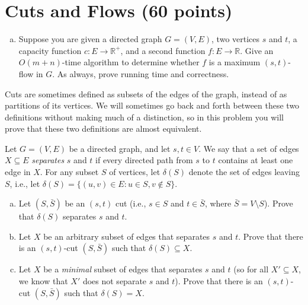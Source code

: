 \documentclass{article}
\begin{document}
\section{Cuts and Flows (60 points)}

\begin{enumerate}[(a)]
	\item Suppose you are given a directed graph $G = (V, E)$, two vertices $s$ and $t$, a capacity function $c: E \rightarrow \mathbb{R}^+$, and a second function $f : E \rightarrow \mathbb{R}$. Give an $O(m+n)$-time algorithm to determine whether $f$ is a maximum $(s,t)$-flow in $G$.  As always, prove running time and correctness.

\end{enumerate}

Cuts are sometimes defined as subsets of the edges of the graph, instead of as partitions of its vertices. We will sometimes go back and forth between these two definitions without making much of a distinction, so in this problem you will prove that these two definitions are almost equivalent.

Let $G = (V, E)$ be a directed graph, and let $s,t \in V$.  We say that a set of edges $X \subseteq E$ \emph{separates} $s$ and $t$ if every directed path from $s$ to $t$ contains at least one edge in $X$.  For any subset $S$ of vertices, let $\delta(S)$ denote the set of edges leaving $S$, i.e., let $\delta(S) = \{(u,v) \in E : u \in S, v \not\in S\}$.  

\begin{enumerate}[(a), resume]
	\item Let $(S, \bar S)$ be an $(s,t)$ cut (i.e., $s \in S$ and $t \in \bar S$, where $\bar S = V \setminus S$).  Prove that $\delta(S)$ separates $s$ and $t$.

	\item Let $X$ be an arbitrary subset of edges that separates $s$ and $t$. Prove that there is an $(s, t)$-cut $(S, \bar S)$ such that $\delta(S) \subseteq X$.

	\item Let $X$ be a \emph{minimal} subset of edges that separates $s$ and $t$ (so for all $X' \subseteq X$, we know that $X'$ does not separate $s$ and $t$).  Prove that there is an $(s, t)$-cut $(S,\bar S)$ such that $\delta(S) = X$.

\end{enumerate}
\end{document}
